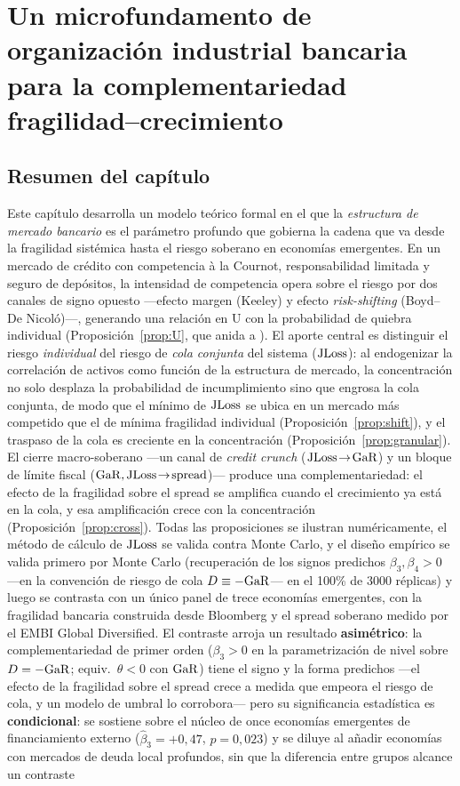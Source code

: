 \chapter{Un microfundamento de organización industrial bancaria para la complementariedad fragilidad--crecimiento}
\label{chap:paper1}

\section*{Resumen del capítulo}

Este capítulo desarrolla un modelo teórico formal en el que la \textit{estructura de mercado bancario} es el parámetro profundo que gobierna la cadena que va desde la fragilidad sistémica hasta el riesgo soberano en economías emergentes. En un mercado de crédito con competencia à la Cournot, responsabilidad limitada y seguro de depósitos, la intensidad de competencia opera sobre el riesgo por dos canales de signo opuesto ---efecto margen (Keeley) y efecto \textit{risk-shifting} (Boyd--De Nicoló)---, generando una relación en U con la probabilidad de quiebra individual (Proposición~\ref{prop:U}, que anida a \citealp{MMR2010}). El aporte central es distinguir el riesgo \textit{individual} del riesgo de \textit{cola conjunta} del sistema ($\mathrm{JLoss}$): al endogenizar la correlación de activos como función de la estructura de mercado, la concentración no solo desplaza la probabilidad de incumplimiento sino que engrosa la cola conjunta, de modo que el mínimo de $\mathrm{JLoss}$ se ubica en un mercado más competido que el de mínima fragilidad individual (Proposición~\ref{prop:shift}), y el traspaso de la cola es creciente en la concentración (Proposición~\ref{prop:granular}). El cierre macro-soberano ---un canal de \textit{credit crunch} ($\mathrm{JLoss}\!\to\!\mathrm{GaR}$) y un bloque de límite fiscal ($\mathrm{GaR},\mathrm{JLoss}\!\to\!\mathrm{spread}$)--- produce una complementariedad: el efecto de la fragilidad sobre el spread se amplifica cuando el crecimiento ya está en la cola, y esa amplificación crece con la concentración (Proposición~\ref{prop:cross}). Todas las proposiciones se ilustran numéricamente, el método de cálculo de $\mathrm{JLoss}$ se valida contra Monte Carlo, y el diseño empírico se valida primero por Monte Carlo (recuperación de los signos predichos $\beta_3,\beta_4>0$ ---en la convención de riesgo de cola $D\equiv-\mathrm{GaR}$--- en el 100\% de $3000$ réplicas) y luego se contrasta con un único panel de trece economías emergentes, con la fragilidad bancaria construida desde Bloomberg y el spread soberano medido por el EMBI Global Diversified. El contraste arroja un resultado \textbf{asimétrico}: la complementariedad de primer orden ($\beta_3>0$ en la parametrización de nivel sobre $D=-\mathrm{GaR}$; equiv.\ $\theta<0$ con $\mathrm{GaR}$) tiene el signo y la forma predichos —el efecto de la fragilidad sobre el spread crece a medida que empeora el riesgo de cola, y un modelo de umbral lo corrobora— pero su significancia estadística es \textbf{condicional}: se sostiene sobre el núcleo de once economías emergentes de financiamiento externo ($\hat\beta_3=+0{,}47$, $p=0{,}023$) y se diluye al añadir economías con mercados de deuda local profundos, sin que la diferencia entre grupos alcance un contraste 